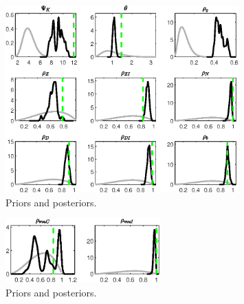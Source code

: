 \begin{figure}[H]
\centering
\includegraphics[width=0.80\textwidth]{BRS_sectoral_artificial_data/Output/BRS_sectoral_artificial_data_PriorsAndPosteriors3}
\caption{Priors and posteriors.}\label{Fig:PriorsAndPosteriors:3}
\end{figure}
 
\begin{figure}[H]
\centering
\includegraphics[width=0.53\textwidth]{BRS_sectoral_artificial_data/Output/BRS_sectoral_artificial_data_PriorsAndPosteriors4}
\caption{Priors and posteriors.}\label{Fig:PriorsAndPosteriors:4}
\end{figure}
 
